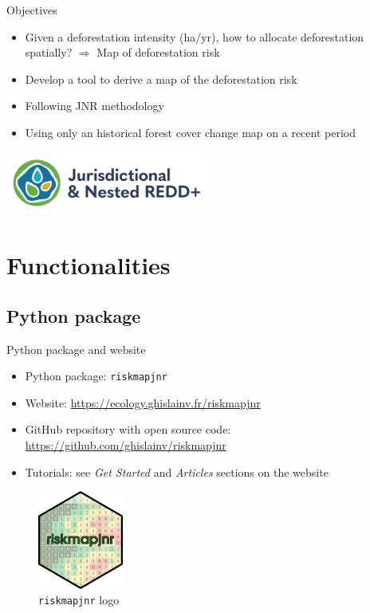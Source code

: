 \documentclass[10pt,table,dvipsnames,compress]{beamer}
\begin{document}
\begin{frame}[label={sec:org79745ff}]{Objectives}
\begin{itemize}
\item Given a deforestation intensity (ha/yr), how to allocate deforestation \alert{spatially}? \(\Rightarrow\) Map of deforestation risk
\item Develop a tool to derive a map of the deforestation risk
\item Following JNR methodology
\item Using only an historical forest cover change map on a recent period
\end{itemize}

\begin{center}
\includegraphics[width=0.5\textwidth]{figs/jnr.png}
\end{center}
\end{frame}

\section{Functionalities}
\label{sec:orge5ec792}

\subsection{Python package}
\label{sec:orgb128efa}

\begin{frame}[label={sec:orgb67c257},fragile]{Python package and website}
 \begin{itemize}
\item Python package: \texttt{riskmapjnr}
\item Website: \url{https://ecology.ghislainv.fr/riskmapjnr}
\item GitHub repository with open source code: \url{https://github.com/ghislainv/riskmapjnr}
\item Tutorials: see \emph{Get Started} and \emph{Articles} sections on the website
\end{itemize}

\begin{figure}[htbp]
\centering
\includegraphics[width=0.25\textwidth]{figs/logo-riskmapjnr.png}
\caption{\texttt{riskmapjnr} logo}
\end{figure}
\end{frame}
\end{document}
